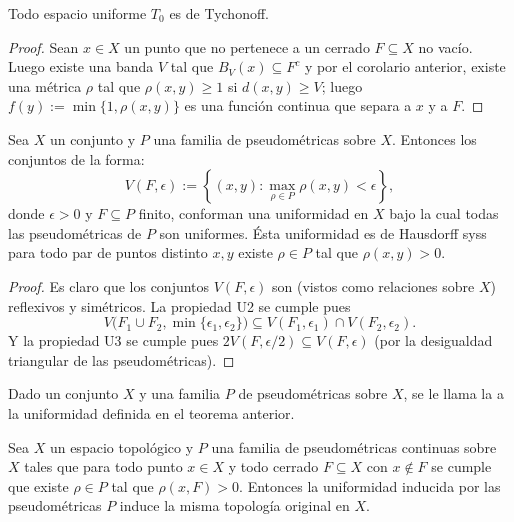 \documentclass[topologia-analisis.tex]{subfiles}
\begin{document}
\begin{cor}
	Todo espacio uniforme $T_0$ es de Tychonoff.
\end{cor}
\begin{proof}
	Sean $x \in X$ un punto que no pertenece a un cerrado $F \subseteq X$ no vacío.
	Luego existe una banda $V$ tal que $B_V(x) \subseteq F^c$ y por el corolario anterior, existe una métrica $\rho$
	tal que $\rho(x, y) \ge 1$ si $d(x, y) \ge V$; luego $f(y) := \min\{1, \rho(x, y)\}$ es una función continua que separa a $x$ y a $F$.
\end{proof}
\thmdep{}

\begin{thm}
	Sea $X$ un conjunto y $P$ una familia de pseudométricas sobre $X$. Entonces los conjuntos de la forma:
	$$ V(F, \epsilon) := \left\{ (x, y) : \max_{\rho \in P} \rho(x, y) < \epsilon \right\}, $$
	donde $\epsilon > 0$ y $F \subseteq P$ finito, conforman una uniformidad en $X$ bajo la cual todas las pseudométricas de $P$ son uniformes.
	Ésta uniformidad es de Hausdorff syss para todo par de puntos distinto $x, y$ existe $\rho \in P$ tal que $\rho(x, y) > 0$.
\end{thm}
\begin{proof}
	Es claro que los conjuntos $V(F, \epsilon)$ son (vistos como relaciones sobre $X$) reflexivos y simétricos.
	La propiedad U2 se cumple pues
	$$ V\big( F_1 \cup F_2, \min\{ \epsilon_1, \epsilon_2 \} \big) \subseteq V(F_1, \epsilon_1) \cap V(F_2, \epsilon_2). $$
	Y la propiedad U3 se cumple pues $2V(F, \epsilon/2) \subseteq V(F, \epsilon)$ (por la desigualdad triangular de las pseudométricas).
\end{proof}
\begin{mydef}
	Dado un conjunto $X$ y una familia $P$ de pseudométricas sobre $X$, se le llama la %
	 a la uniformidad definida en el teorema anterior.
\end{mydef}

\begin{prop}
	Sea $X$ un espacio topológico y $P$ una familia de pseudométricas continuas sobre $X$ tales que para todo punto $x \in X$ y todo cerrado $F \subseteq X$
	con $x \notin F$ se cumple que existe $\rho \in P$ tal que $\rho(x, F) > 0$.
	Entonces la uniformidad inducida por las pseudométricas $P$ induce la misma topología original en $X$.
\end{prop}
\end{document}
